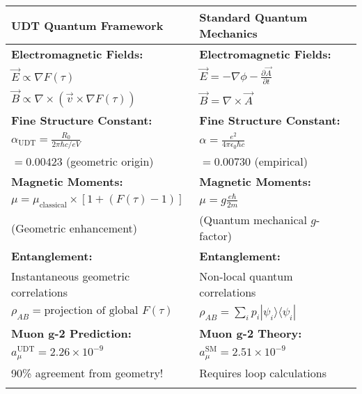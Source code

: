 \documentclass[11pt,a4paper]{article}
\begin{document}
\begin{center}
\begin{tabular}{|p{}|p{}|}
\hline
\textcolor{udtblue}{\textbf{UDT Quantum Framework}} & \textcolor{standardred}{\textbf{Standard Quantum Mechanics}} \\
\hline
\vspace{0.3cm}
\textbf{Electromagnetic Fields:} & \textbf{Electromagnetic Fields:} \\
$\vec{E} \propto \nabla F(\tau)$ & $\vec{E} = -\nabla \phi - \frac{\partial \vec{A}}{\partial t}$ \\
$\vec{B} \propto \nabla \times (\vec{v} \times \nabla F(\tau))$ & $\vec{B} = \nabla \times \vec{A}$ \\
\vspace{0.3cm}

\textbf{Fine Structure Constant:} & \textbf{Fine Structure Constant:} \\
$\alpha_{\text{UDT}} = \frac{R_0}{2\pi \hbar c / eV}$ & $\alpha = \frac{e^2}{4\pi\epsilon_0\hbar c}$ \\
$= 0.00423$ (geometric origin) & $= 0.00730$ (empirical) \\
\vspace{0.3cm}

\textbf{Magnetic Moments:} & \textbf{Magnetic Moments:} \\
$\mu = \mu_{\text{classical}} \times [1 + (F(\tau) - 1)]$ & $\mu = g \frac{e\hbar}{2m}$ \\
(Geometric enhancement) & (Quantum mechanical $g$-factor) \\
\vspace{0.3cm}

\textbf{Entanglement:} & \textbf{Entanglement:} \\
Instantaneous geometric correlations & Non-local quantum correlations \\
$\rho_{AB} = \text{projection of global } F(\tau)$ & $\rho_{AB} = \sum_i p_i |\psi_i\rangle\langle\psi_i|$ \\
\vspace{0.3cm}

\textbf{Muon g-2 Prediction:} & \textbf{Muon g-2 Theory:} \\
$a_\mu^{\text{UDT}} = 2.26 \times 10^{-9}$ & $a_\mu^{\text{SM}} = 2.51 \times 10^{-9}$ \\
\textcolor{udtblue}{90\% agreement from geometry!} & \textcolor{standardred}{Requires loop calculations} \\
\vspace{0.3cm}
\hline
\end{tabular}
\end{center}
\end{document}
